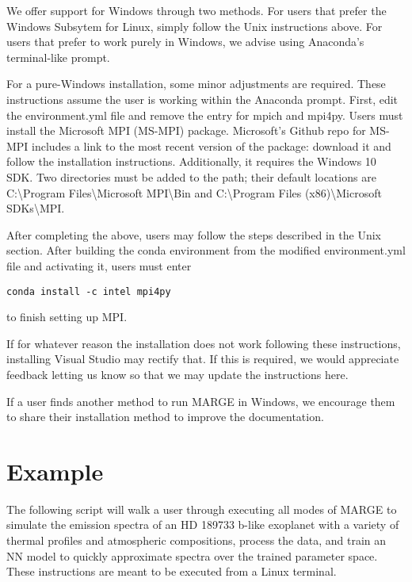 \documentclass[letterpaper, 12pt]{article}
\begin{document}
\noindent We offer support for Windows through two methods.  For users that 
prefer the Windows Subsytem for Linux, simply follow the Unix instructions 
above.  For users that prefer to work purely in Windows, we advise using 
Anaconda's terminal-like prompt.\newline

\noindent For a pure-Windows installation, some minor adjustments are required.
These instructions assume the user is working within the Anaconda prompt.  
First, edit the environment.yml file and remove the entry for mpich and mpi4py. 
Users must install the Microsoft MPI (MS-MPI) package.  Microsoft's Github repo 
for MS-MPI includes a link to the most recent version of the package: download 
it and follow the installation instructions.  Additionally, it requires the 
Windows 10 SDK.  Two directories must be added to the path; their default 
locations are C:{\textbackslash}Program Files{\textbackslash}Microsoft MPI{\textbackslash}Bin and 
C:{\textbackslash}Program Files (x86){\textbackslash}Microsoft SDKs{\textbackslash}MPI. \newline

After completing the above, users may follow the steps described in the Unix 
section.  After building the conda environment from the modified environment.yml
file and activating it, users must enter
\begin{verbatim}
conda install -c intel mpi4py
\end{verbatim}
\noindent to finish setting up MPI.\newline

\noindent If for whatever reason the installation does not work following these 
instructions, installing Visual Studio may rectify that.  If this is required, 
we would appreciate feedback letting us know so that we may update the 
instructions here. \newline

\noindent If a user finds another method to run MARGE 
in Windows, we encourage them to share their installation method to improve the 
documentation.


\section{Example}
\label{sec:example}

\noindent The following script will walk a user through executing all modes of 
MARGE to simulate the emission spectra of an HD 189733 b-like exoplanet with a 
variety of thermal profiles and atmospheric compositions, process the data, and 
train an NN model to quickly approximate spectra over the trained parameter 
space.  These instructions are meant to be executed from a Linux terminal.  
\end{document}
